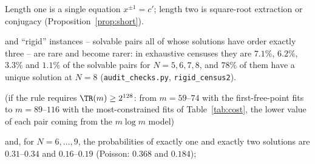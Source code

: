 \begin{thm}
\begin{defi}[\textsc{Order-3 Conjugacy}, $\Dzero$]
Length one is a single equation $x^{\pm1}=c'$; length two is square-root extraction or conjugacy (Proposition~\ref{prop:short}).

and ``rigid'' instances -- solvable pairs all of whose solutions have order exactly three -- are rare and become rarer: in exhaustive
censuses they are $7.1\%$, $6.2\%$, $3.3\%$ and $1.1\%$ of the solvable pairs for $N=5,6,7,8$, and $78\%$ of them have a unique solution at
$N=8$ (\texttt{audit\_checks.py}, \texttt{rigid\_census2}).

(if the rule requires $\TR(m)\ge2^{128}$: from $m=59$--$74$ with the first-free-point fits to $m=89$--$116$ with the most-constrained fits of
Table~\ref{tab:cost}, the lower value of each pair coming from the $m\log m$ model)

and, for $N=6,\ldots,9$, the probabilities of exactly one and exactly two solutions are $0.31$--$0.34$ and $0.16$--$0.19$ (Poisson: $0.368$
and $0.184$);


\end{defi}
\end{thm}
